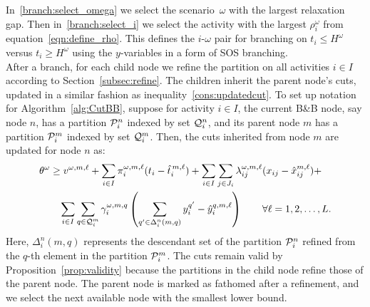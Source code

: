 \documentclass[11pt]{article}
\newcommand{\cQ}{{\cal Q}}
\newcommand{\cP}{{\cal P}}
\begin{document}
	In~\eqref{branch:select_omega} we select the scenario~\({\omega}\) with the largest relaxation gap. Then in~\eqref{branch:select_i} we select the activity with the largest \(\rho_{i}^{{\omega}}\) from equation~\eqref{eqn:define_rho}. This defines the $i$-$\omega$ pair for branching on $t_i \le H^\omega$ versus $t_i \ge H^\omega$ using the $y$-variables in a form of SOS branching. \\ 
	\newline
	After a branch, for each child node we refine the partition on all activities \(i \in I\) according to Section~\ref{subsec:refine}.
	The children inherit the parent node's cuts, updated in a similar fashion as inequality~\eqref{cons:updatedcut}. To set up notation for Algorithm~\ref{alg:CutBB},  suppose for activity \(i \in I\), the current B\&B node, say node \(n\), has a partition \(\cP_i^n\) indexed by set \(\cQ_i^n\), and its parent node \(m\) has a partition \(\cP_i^m\) indexed by set \(\cQ_i^m\). Then, the cuts inherited from node \(m\) are updated for node \(n\) as:
	\begin{align}\label{cons:updatedcutBB}
	& \theta^\omega \geq v^{\omega,m,\ell} + \sum_{i \in I} \pi_i^{\omega,m,\ell} (t_i - \hat{t}_i^{\, m,\ell}) + \sum_{i \in I} \sum_{j \in J_i} \lambda_{ij}^{\omega,m,\ell} (x_{ij} - \hat{x}_{ij}^{m,\ell}) + \nonumber \\
	& \qquad \sum_{i \in I} \sum_{q \in \cQ^{m}_i} \gamma_{i}^{\omega,m,q} \left( \sum_{q^\prime \in \Delta^n_i(m,q)} y_i^{q^\prime} - \hat{y}_i^{q,m,\ell} \right) \qquad \forall \ell = 1,2, \dots, L.
	\end{align}
	Here, \(\Delta^n_i(m,q)\) represents the descendant set of the partition \(\cP_i^n\) refined from the \(q\)-th element in the partition \(\cP_i^m\). The cuts remain valid by Proposition~\ref{prop:validity} because the partitions in the child node refine those of the parent node. The parent node is marked as fathomed after a refinement, and we select the next available node with the smallest lower bound.  \\
\end{document}
